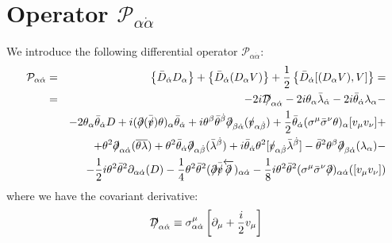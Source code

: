 \documentclass[a4paper,12pt]{article}
\newcommand{\slashed}[1]{\hbox{{$#1$}\llap{$/$}}}
\begin{document}
\section{Operator $ \mathcal{P}_{\alpha\dot{\alpha}} $}
  We introduce the following differential operator 
$ \mathcal{P}_{\alpha\dot{\alpha}} $: 
\begin{eqnarray*}
   \mathcal{P}_{\alpha\dot{\alpha}} & = & \left\{ \bar{D}_{\dot{\alpha}} 
D_\alpha \right \} + 
   \left\{ \bar{D}_{\dot{\alpha}} ( D_\alpha V ) \right \} + 
   \frac{1}{2} \left\{ \bar{D}_{\dot{\alpha}}  
             [ (D_\alpha V), V ] \right\} = \\
 &  = & - 2 i \slashed{\mathcal{D}}_{\alpha\dot{\alpha}} 
            - 2 i \theta_\alpha \bar{\lambda}_{\dot{\alpha}} 
            - 2 i \bar{\theta}_{\dot{\alpha}} \lambda_\alpha - \\
 &&       - 2 \theta_\alpha \bar{\theta}_{\dot{\alpha}} D 
      + i ( \slashed{\partial} (\bar{\slashed{v}}) \theta )_\alpha \bar{\theta}_{\dot{\alpha}}  
      + i \theta^\beta \bar{\theta}^{\dot{\beta}} 
            \slashed{\partial}_{\beta\dot{\alpha}} 
	     ( \slashed{v}_{\alpha\dot{\beta}} ) 
      + \frac{1}{2} \bar{\theta}_{\dot{\alpha}} 
          ( \sigma^\mu \bar{\sigma}^\nu \theta )_\alpha 
	  [ v_\mu v_\nu ] + \\
  &&  + \theta^2 \slashed{\partial}_{\alpha\dot{\alpha}} ( \overline{\theta\lambda} )  
  + \theta^2 \bar{\theta}_{\dot{\alpha}} \slashed{\partial}_{\alpha\dot{\beta}} 
                 ( \bar{\lambda}^{\dot{\beta}} )
  + i \bar{\theta}_{\dot{\alpha}} \theta^2 
                 [ \slashed{v}_{\alpha\dot{\beta}} \bar{\lambda}^{\dot{\beta}} ]
  - \bar{\theta}^2 \theta^\beta \slashed{\partial}_{\beta\dot{\alpha}} ( \lambda_\alpha ) - \\
  && - \frac{1}{2} i \theta^2 \bar{\theta}^2 \partial_{\alpha\dot{\alpha}} ( D ) 
     - \frac{1}{4} \theta^2 \bar{\theta}^2 ( \slashed{\partial} \bar{\slashed{v}}
                          \overleftarrow{\slashed{\partial}} )_{\alpha\dot{\alpha}} 
     - \frac{1}{8} i \theta^2 \bar{\theta}^2 
                  ( \sigma^\mu \bar{\sigma}^\nu \slashed{\partial} )_{\alpha\dot{\alpha}}
		      ( [v_\mu v_\nu] ) 
\end{eqnarray*}
  where we have the covariant derivative:
\[
   \slashed{\mathcal{D}}_{\alpha\dot{\alpha}} \equiv 
      \sigma^\mu_{\alpha\dot{\alpha}} 
      \left [  \partial_\mu + \frac{i}{2} v_\mu \right ]
\]
\end{document}
